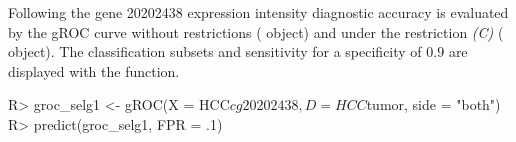 


Following the gene 20202438 expression intensity diagnostic accuracy is evaluated by the gROC curve without restrictions ( object) and under the restriction \textit{(C)} ( object). The classification subsets and sensitivity for a specificity of $0.9$ are displayed with the  function.

\begin{example}
R> groc_selg1 <- gROC(X = HCC$cg20202438, D = HCC$tumor, side = "both")
R> predict(groc_selg1, FPR = .1)
\end{example}


